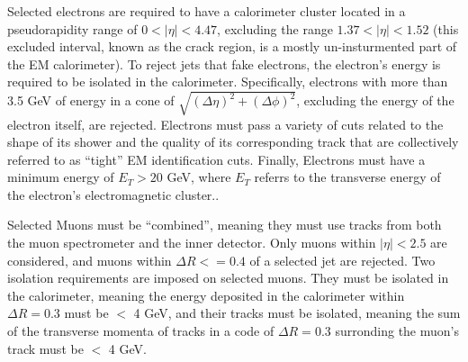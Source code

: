 Selected electrons are required to have a calorimeter cluster located in a pseudorapidity range of $0 < |\eta| < 4.47$, excluding the range $1.37 < |\eta| < 1.52$ (this excluded interval, known as the crack region, is a mostly un-insturmented part of the EM calorimeter).
To reject jets that fake electrons, the electron's energy is required to be isolated in the calorimeter.
Specifically, electrons with more than 3.5 GeV of energy in a cone of $\sqrt{(\Delta \eta)^2 + (\Delta \phi)^2}$, excluding the energy of the electron itself, are rejected.
Electrons must pass a variety of cuts related to the shape of its shower and the quality of its corresponding track that are collectively referred to as ``tight'' EM identification cuts.
Finally, Electrons must have a minimum energy of $E_{T} > 20$ GeV, where $E_{T}$ referrs to the transverse energy of the electron's electromagnetic cluster..


Selected Muons must be ``combined'', meaning they must use tracks from both the muon spectrometer and the inner detector.
Only muons within $|\eta| < 2.5$ are considered, and muons within $\Delta R <= 0.4$ of a selected jet are rejected.
Two isolation requirements are imposed on selected muons.  
They must be isolated in the calorimeter, meaning the energy deposited in the calorimeter within $\Delta R = 0.3$ must be $<$ 4 GeV, and their tracks must be isolated, meaning the sum of the transverse momenta of tracks in a code of $\Delta R = 0.3$ surronding the muon's track must be $<$ 4 GeV.

